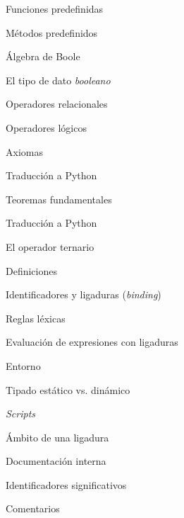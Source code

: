 \begin{longenum}
\begin{longenum}
\begin{longenum}
\begin{longenum}
                \item Funciones predefinidas
                \item Métodos predefinidos
            \end{longenum}
        \end{longenum}
        \item Álgebra de Boole
        \begin{longenum}
            \item El tipo de dato \textit{booleano}
            \item Operadores relacionales
            \item Operadores lógicos
            \item Axiomas
            \begin{longenum}
                \item Traducción a Python
            \end{longenum}
            \item Teoremas fundamentales
            \begin{longenum}
                \item Traducción a Python
            \end{longenum}
            \item El operador ternario
        \end{longenum}
        \item Definiciones
        \begin{longenum}
            \item Identificadores y ligaduras (\textit{binding})
            \begin{longenum}
                \item Reglas léxicas
            \end{longenum}
            \item Evaluación de expresiones con ligaduras
            \item Entorno
            \item Tipado estático vs. dinámico
            \item \textit{Scripts}
            \item Ámbito de una ligadura
        \end{longenum}
        \item Documentación interna
        \begin{longenum}
            \item Identificadores significativos
            \item Comentarios

\end{longenum}
\end{longenum}
\end{longenum}
